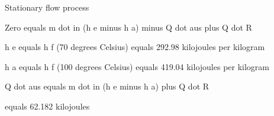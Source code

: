 Stationary flow process

Zero equals m dot in (h e minus h a) minus Q dot aus plus Q dot R

h e equals h f (70 degrees Celsius) equals 292.98 kilojoules per kilogram

h a equals h f (100 degrees Celsius) equals 419.04 kilojoules per kilogram

Q dot aus equals m dot in (h e minus h a) plus Q dot R

equals 62.182 kilojoules